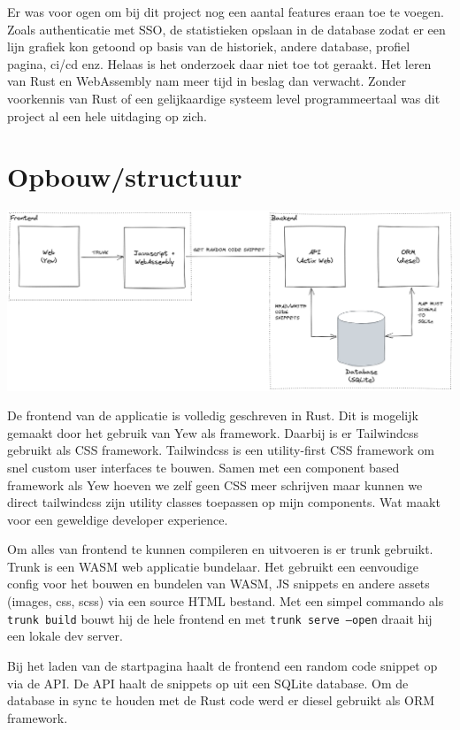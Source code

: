 Er was voor ogen om bij dit project nog een aantal features eraan toe te voegen. Zoals authenticatie
met SSO, de statistieken opslaan in de database zodat er een lijn grafiek kon getoond op basis van
de historiek, andere database, profiel pagina, ci/cd enz. Helaas is het onderzoek daar niet toe tot
geraakt. Het leren van Rust en WebAssembly nam meer tijd in beslag dan verwacht. Zonder voorkennis
van Rust of een gelijkaardige systeem level programmeertaal was dit project al een hele uitdaging op
zich.

\clearpage

\section{Opbouw/structuur}

\includegraphics[width=\textwidth]{./figures/structuur.png}

De frontend van de applicatie is volledig geschreven in Rust. Dit is mogelijk gemaakt door het
gebruik van Yew als framework. Daarbij is er Tailwindcss gebruikt als CSS framework. Tailwindcss is
een utility-first CSS framework om snel custom user interfaces te bouwen. Samen met een component
based framework als Yew hoeven we zelf geen CSS meer schrijven maar kunnen we direct tailwindcss
zijn utility classes toepassen op mijn components. Wat maakt voor een geweldige developer
experience. 

Om alles van frontend te kunnen compileren en uitvoeren is er trunk gebruikt. Trunk is een WASM web
applicatie bundelaar. Het gebruikt een eenvoudige config voor het bouwen en bundelen van WASM, JS
snippets en andere assets (images, css, scss) via een source HTML bestand. Met een simpel commando
als \texttt{trunk build} bouwt hij de hele frontend en met \texttt{trunk serve
--open} draait hij een lokale dev server.  

Bij het laden van de startpagina haalt de frontend een random code snippet op via de API. De API
haalt de snippets op uit een SQLite database. Om de database in sync te houden met de Rust code werd
er diesel gebruikt als ORM framework.


